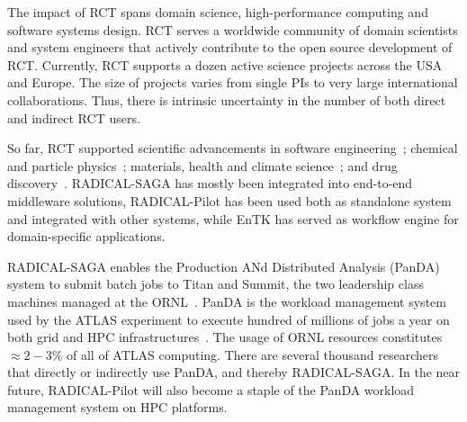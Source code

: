 \documentclass[preprint,12pt, a4paper]{elsarticle}
\begin{document}

The impact of RCT spans domain science, high-performance computing and
software systems design. RCT serves a worldwide community of domain
scientists and system engineers that actively contribute to the open source
development of RCT. Currently, RCT supports a dozen active science projects
across the USA and Europe. The size of projects varies from single PIs to
very large international collaborations. Thus, there is intrinsic uncertainty
in the number of both direct and indirect RCT users.

So far, RCT supported scientific advancements in software
engineering~\cite{merzky2018synapse}; chemical and particle
physics~\cite{paraskevakos2018task,shkurti2016coco,dakka2018high,oleynik2017high};
materials, health and climate science~\cite{mhcs}; and drug
discovery~\cite{dd}. RADICAL-SAGA has mostly been integrated into end-to-end
middleware solutions, RADICAL-Pilot has been used both as standalone system
and integrated with other systems, while EnTK has served as workflow engine
for domain-specific applications.

RADICAL-SAGA enables the Production ANd Distributed Analysis (PanDA) system
to submit batch jobs to Titan and Summit, the two leadership class machines
managed at the ORNL~\cite{web-olcf-resources}. PanDA is the workload
management system used by the ATLAS experiment to execute hundred of millions
of jobs a year on both grid and HPC infrastructures~\cite{maeno2008panda}.
The usage of ORNL resources constitutes $\approx 2-3$\% of all of ATLAS
computing. There are several thousand researchers that directly or indirectly
use PanDA, and thereby RADICAL-SAGA. In the near future, RADICAL-Pilot will
also become a staple of the PanDA workload management system on HPC
platforms.
\end{document}
